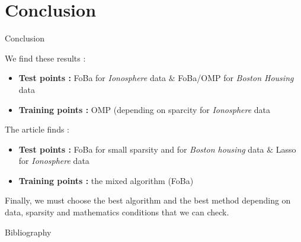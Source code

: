 \documentclass[unknownkeysallowed]{beamer}
\begin{document}
\section{Conclusion}
\label{sec:conclusion}


\begin{frame}{Conclusion}

\vspace{0.5cm}
We find these results :
\begin{itemize}
    \item \textbf{Test points :} FoBa for \textit{Ionosphere} data $\&$ FoBa/OMP for \textit{Boston Housing} data
    \item \textbf{Training points :} OMP (depending on sparcity for \textit{Ionosphere} data
\end{itemize}
\vspace{0.2cm}
The article finds :
\begin{itemize}
    \item \textbf{Test points :} FoBa for small sparsity and for \textit{Boston housing} data $\&$ Lasso for \textit{Ionosphere} data
    \item \textbf{Training points :} the mixed algorithm (FoBa)
\end{itemize}
\vspace{0.5cm}
Finally, we must choose the best algorithm and the best method depending on data, sparsity and mathematics conditions that we can check.

\end{frame}

\begin{frame}{Bibliography}
\nocite{*}
\printbibliography
\end{frame}
\end{document}
